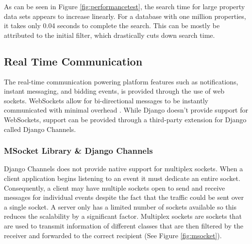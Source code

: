 As can be seen in Figure \ref{fig:performancetest}, the search time for large
property data sets appears to increase linearly. For a database with one million
properties, it takes only 0.04 seconds to complete the search. This can be mostly
be attributed to the initial filter, which drastically cuts down search time.

\newpage
\subsection{Real Time Communication}\label{realtime}

The real-time communication powering platform features such as notifications,
instant messaging, and bidding events, is provided through the use of web
sockets. WebSockets allow for bi-directional messages to be instantly
communicated with minimal overhead \parencite{websocket}. While Django doesn't
provide support for WebSockets, support can be provided through a third-party
extension for Django called Django Channels.

\subsubsection{MSocket Library \& Django Channels}

Django Channels does not provide native support for multiplex sockets. When
a client application begins listening to an event it must dedicate an entire
socket. Consequently, a client may have multiple sockets open to send and
receive messages for individual events despite the fact that the traffic could
be sent over a single socket. A server only has a limited number of sockets
available so this reduces the scalability by a significant factor. Multiplex
sockets are sockets that are used to transmit information of different classes
that are then filtered by the receiver and forwarded to the correct recipient
(See Figure \ref{fig:msocket}).

